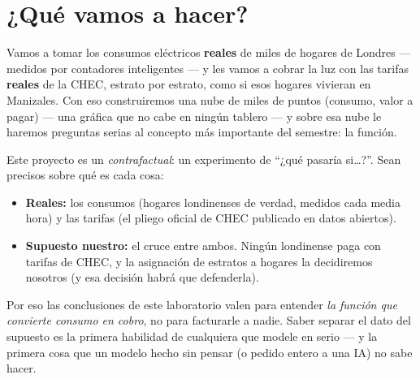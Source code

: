 \documentclass[12pt,letterpaper]{article}
\begin{document}
\section{¿Qué vamos a hacer?}
Vamos a tomar los consumos eléctricos \textbf{reales} de miles de hogares de Londres --- medidos por contadores inteligentes --- y les vamos a cobrar la luz con las tarifas \textbf{reales} de la CHEC, estrato por estrato, como si esos hogares vivieran en Manizales. Con eso construiremos una nube de miles de puntos (consumo, valor a pagar) --- una gráfica que no cabe en ningún tablero --- y sobre esa nube le haremos preguntas serias al concepto más importante del semestre: la función.

\begin{cajareal}
Este proyecto es un \emph{contrafactual}: un experimento de ``¿qué pasaría si\ldots?''. Sean precisos sobre qué es cada cosa:
\begin{itemize}[itemsep=0.1em]
    \item \textbf{Reales:} los consumos (hogares londinenses de verdad, medidos cada media hora) y las tarifas (el pliego oficial de CHEC publicado en datos abiertos).
    \item \textbf{Supuesto nuestro:} el cruce entre ambos. Ningún londinense paga con tarifas de CHEC, y la asignación de estratos a hogares la decidiremos nosotros (y esa decisión habrá que defenderla).
\end{itemize}
Por eso las conclusiones de este laboratorio valen para entender \emph{la función que convierte consumo en cobro}, no para facturarle a nadie. Saber separar el dato del supuesto es la primera habilidad de cualquiera que modele en serio --- y la primera cosa que un modelo hecho sin pensar (o pedido entero a una IA) no sabe hacer.
\end{cajareal}
\end{document}
